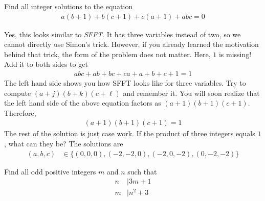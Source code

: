 \begin{problem}
	Find all integer solutions to the equation
		\begin{align*}
			a(b+1)+b(c+1)+c(a+1)+abc=0
		\end{align*}
\end{problem}

\begin{solution}
	Yes, this looks similar to \textit{SFFT}. It has three variables instead of two, so we cannot directly use Simon's trick. However, if you already learned the motivation behind that trick, the form of the problem does not matter. Here, $1$ is missing! Add it to both sides to get
		\begin{align*}
			abc+ab+bc+ca+a+b+c+1=1
		\end{align*}
	The left hand side shows you how SFFT looks like for three variables. Try to compute $(a+j)(b+k)(c+\ell)$ and remember it. You will soon realize that the left hand side of the above equation factors as $(a+1)(b+1)(c+1)$. Therefore,
		\begin{align*}
			(a+1)(b+1)(c+1)=1
		\end{align*}
	The rest of the solution is just case work. If the product of three integers equals $1$, what can they be? The solutions are
		\begin{align*}
			(a,b,c)
				& \in\{(0,0,0), (-2,-2,0), (-2,0,-2), (0,-2,-2)\}
		\end{align*}
\end{solution}

\begin{problem}
	Find all odd positive integers $m$ and $n$ such that
		\begin{align*}
			n
				& \mid 3m+1\\
			m
				& \mid n^2+3
		\end{align*}
\end{problem}

